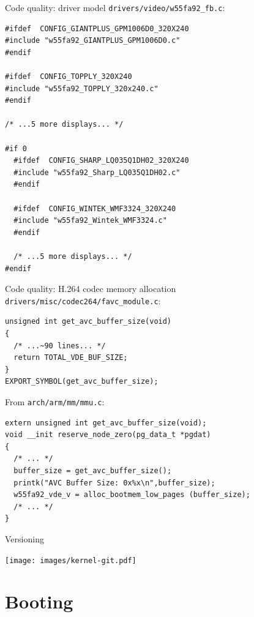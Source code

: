 \documentclass[xetex,table]{beamer}
\begin{document}
\begin{frame}[fragile]{Code quality: driver model}
  \texttt{drivers/video/w55fa92\_fb.c}:

  \linespread{0.9}
  \begin{verbatim}
#ifdef  CONFIG_GIANTPLUS_GPM1006D0_320X240
#include "w55fa92_GIANTPLUS_GPM1006D0.c"
#endif

#ifdef  CONFIG_TOPPLY_320X240
#include "w55fa92_TOPPLY_320x240.c"
#endif

/* ...5 more displays... */

#if 0
  #ifdef  CONFIG_SHARP_LQ035Q1DH02_320X240
  #include "w55fa92_Sharp_LQ035Q1DH02.c"
  #endif

  #ifdef  CONFIG_WINTEK_WMF3324_320X240
  #include "w55fa92_Wintek_WMF3324.c"
  #endif

  /* ...5 more displays... */
#endif
  \end{verbatim}
\end{frame}

\begin{frame}[fragile]{Code quality: H.264 codec memory allocation}
  \linespread{1}
  \texttt{drivers/misc/codec264/favc\_module.c}:

  \begin{verbatim}
unsigned int get_avc_buffer_size(void)
{
  /* ...~90 lines... */
  return TOTAL_VDE_BUF_SIZE;
}
EXPORT_SYMBOL(get_avc_buffer_size);
  \end{verbatim}

  From {\small\texttt{arch/arm/mm/mmu.c}}:
  \begin{verbatim}
extern unsigned int get_avc_buffer_size(void);
void __init reserve_node_zero(pg_data_t *pgdat)
{
  /* ... */
  buffer_size = get_avc_buffer_size();
  printk("AVC Buffer Size: 0x%x\n",buffer_size);
  w55fa92_vde_v = alloc_bootmem_low_pages (buffer_size);
  /* ... */
}
  \end{verbatim}
\end{frame}

\begin{frame}{Versioning}
  \begin{center}
    \texttt{[image: images/kernel-git.pdf]}
  \end{center}
\end{frame}

\section{Booting}
\end{document}
